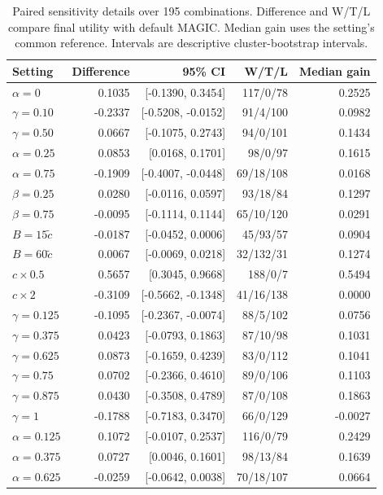\documentclass[journal]{IEEEtran}
\newcommand{\smalltable}{\footnotesize\setlength{\tabcolsep}{3.5pt}}
\begin{document}
\begin{table}[t]
\caption{Paired sensitivity details over 195 combinations. Difference and W/T/L compare final utility with default MAGIC. Median gain uses the setting's common reference. Intervals are descriptive cluster-bootstrap intervals.}
\label{tab:intervals}\centering\smalltable
\begin{tabular}{lrrrr}
\toprule
Setting & Difference & 95\% CI & W/T/L & Median gain \\
\midrule
$\alpha=0$ & 0.1035 & [-0.1390, 0.3454] & 117/0/78 & 0.2525 \\
$\gamma=0.10$ & -0.2337 & [-0.5208, -0.0152] & 91/4/100 & 0.0982 \\
$\gamma=0.50$ & 0.0667 & [-0.1075, 0.2743] & 94/0/101 & 0.1434 \\
$\alpha=0.25$ & 0.0853 & [0.0168, 0.1701] & 98/0/97 & 0.1615 \\
$\alpha=0.75$ & -0.1909 & [-0.4007, -0.0448] & 69/18/108 & 0.0168 \\
$\beta=0.25$ & 0.0280 & [-0.0116, 0.0597] & 93/18/84 & 0.1297 \\
$\beta=0.75$ & -0.0095 & [-0.1114, 0.1144] & 65/10/120 & 0.0291 \\
$B=15\tilde c$ & -0.0187 & [-0.0452, 0.0006] & 45/93/57 & 0.0904 \\
$B=60\tilde c$ & 0.0067 & [-0.0069, 0.0218] & 32/132/31 & 0.1274 \\
$c\times0.5$ & 0.5657 & [0.3045, 0.9668] & 188/0/7 & 0.5494 \\
$c\times2$ & -0.3109 & [-0.5662, -0.1348] & 41/16/138 & 0.0000 \\
$\gamma=0.125$ & -0.1095 & [-0.2367, -0.0074] & 88/5/102 & 0.0756 \\
$\gamma=0.375$ & 0.0423 & [-0.0793, 0.1863] & 87/10/98 & 0.1031 \\
$\gamma=0.625$ & 0.0873 & [-0.1659, 0.4239] & 83/0/112 & 0.1041 \\
$\gamma=0.75$ & 0.0702 & [-0.2366, 0.4610] & 89/0/106 & 0.1103 \\
$\gamma=0.875$ & 0.0430 & [-0.3508, 0.4789] & 87/0/108 & 0.1863 \\
$\gamma=1$ & -0.1788 & [-0.7183, 0.3470] & 66/0/129 & -0.0027 \\
$\alpha=0.125$ & 0.1072 & [-0.0107, 0.2537] & 116/0/79 & 0.2429 \\
$\alpha=0.375$ & 0.0727 & [0.0046, 0.1601] & 98/13/84 & 0.1639 \\
$\alpha=0.625$ & -0.0259 & [-0.0642, 0.0038] & 70/18/107 & 0.0664 \\

\end{tabular}
\end{table}
\end{document}
